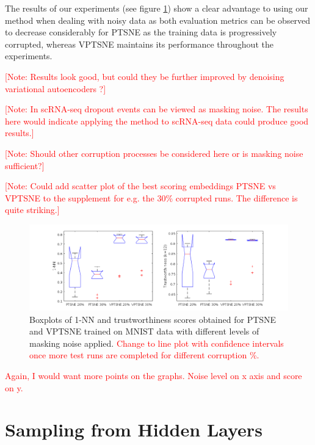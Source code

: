 The results of our experiments (see figure \ref{fig:corrupted_data}) show a clear advantage to using our method when dealing with noisy data as both evaluation metrics can be observed to decrease considerably for PTSNE as the training data is progressively corrupted, whereas VPTSNE maintains its performance throughout the experiments.

\noindent \textcolor{red}{[Note: Results look good, but could they be further improved by denoising variational autoencoders \citep{denoising_vae}?]}

\noindent \textcolor{red}{[Note: In scRNA-seq dropout events can be viewed as masking noise. The results here would indicate applying the method to scRNA-seq data could produce good results.]}

\noindent \textcolor{red}{[Note: Should other corruption processes be considered here or is masking noise sufficient?]}

\noindent \textcolor{red}{[Note: Could add scatter plot of the best scoring embeddings PTSNE vs VPTSNE to the supplement for e.g. the 30\% corrupted runs. The difference is quite striking.]}

\begin{figure}[!htb]
  \centering
  \includegraphics[width=\textwidth]{images/corrupted_data.png}
  \caption{Boxplots of 1-NN and trustworthiness scores obtained for PTSNE and VPTSNE trained on MNIST data with different levels of masking noise applied. \textcolor{red}{Change to line plot with confidence intervals once more test runs are completed for different corruption \%.}}
  \label{fig:corrupted_data}
\end{figure}

\textcolor{red}{ Again, I would want more points on the graphs. Noise level on x axis and score on y. }

\section{Sampling from Hidden Layers}
\label{subsection:obtaining_reconstructions_from_hidden_layers}

